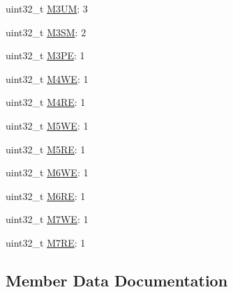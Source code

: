 \begin{DoxyCompactItemize}
uint32\+\_\+t \hyperlink{struct__hw__mpu__rgdn__word2_1_1__hw__mpu__rgdn__word2__bitfields_ab23fa729baa9ea707087779baf910c78}{M3\+UM}\+: 3
\item 
uint32\+\_\+t \hyperlink{struct__hw__mpu__rgdn__word2_1_1__hw__mpu__rgdn__word2__bitfields_a70e6f7922791b760ebe166566dc2377a}{M3\+SM}\+: 2
\item 
uint32\+\_\+t \hyperlink{struct__hw__mpu__rgdn__word2_1_1__hw__mpu__rgdn__word2__bitfields_a9895a367a7374c73f89da76eaeced309}{M3\+PE}\+: 1
\item 
uint32\+\_\+t \hyperlink{struct__hw__mpu__rgdn__word2_1_1__hw__mpu__rgdn__word2__bitfields_a3ea51630176e7d0643f44f5d4f068bed}{M4\+WE}\+: 1
\item 
uint32\+\_\+t \hyperlink{struct__hw__mpu__rgdn__word2_1_1__hw__mpu__rgdn__word2__bitfields_ac49c872f4b7986035c0a5115f88380d3}{M4\+RE}\+: 1
\item 
uint32\+\_\+t \hyperlink{struct__hw__mpu__rgdn__word2_1_1__hw__mpu__rgdn__word2__bitfields_aa22b4f805071f19977531ef79ed51640}{M5\+WE}\+: 1
\item 
uint32\+\_\+t \hyperlink{struct__hw__mpu__rgdn__word2_1_1__hw__mpu__rgdn__word2__bitfields_a258c3af6c2d594b2c6b0ded767b18d71}{M5\+RE}\+: 1
\item 
uint32\+\_\+t \hyperlink{struct__hw__mpu__rgdn__word2_1_1__hw__mpu__rgdn__word2__bitfields_a469c46577b88285efe3694936b062ff3}{M6\+WE}\+: 1
\item 
uint32\+\_\+t \hyperlink{struct__hw__mpu__rgdn__word2_1_1__hw__mpu__rgdn__word2__bitfields_a24a8769020502d56f886e303326f961e}{M6\+RE}\+: 1
\item 
uint32\+\_\+t \hyperlink{struct__hw__mpu__rgdn__word2_1_1__hw__mpu__rgdn__word2__bitfields_a438d6131183b0453b882d29c97a37b92}{M7\+WE}\+: 1
\item 
uint32\+\_\+t \hyperlink{struct__hw__mpu__rgdn__word2_1_1__hw__mpu__rgdn__word2__bitfields_a6994265336bd5a387da0f7e20e1954d6}{M7\+RE}\+: 1
\end{DoxyCompactItemize}


\subsection{Member Data Documentation}
